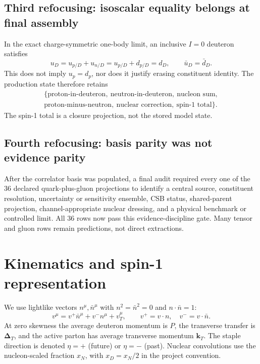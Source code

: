 \documentclass[11pt]{article}
\newcommand{\kT}{\bm{k}_{T}}
\newcommand{\DT}{\bm{\Delta}_{T}}
\begin{document}
\subsection{Third refocusing: isoscalar equality belongs at final assembly}

In the exact charge-symmetric one-body limit, an inclusive \(I=0\)
deuteron satisfies
\begin{equation}
u_D=u_{p/D}+u_{n/D}=u_{p/D}+d_{p/D}=d_D,
\qquad
\bar u_D=\bar d_D.
\label{eq:isoscalar}
\end{equation}
This does not imply \(u_p=d_p\), nor does it justify erasing constituent
identity.  The production state therefore retains
\begin{multline*}
\{\text{proton-in-deuteron},\ \text{neutron-in-deuteron},\
\text{nucleon sum},\\
\text{proton-minus-neutron},\ \text{nuclear correction},\
\text{spin-1 total}\}.
\end{multline*}
The spin-1 total is a closure projection, not the stored model state.

\subsection{Fourth refocusing: basis parity was not evidence parity}

After the correlator basis was populated, a final audit required every one
of the 36 declared quark-plus-gluon projections to identify a central
source, constituent resolution, uncertainty or sensitivity ensemble, CSB
status, shared-parent projection, channel-appropriate nuclear dressing, and
a physical benchmark or controlled limit.  All 36 rows now pass this
evidence-discipline gate.  Many tensor and gluon rows remain predictions,
not direct extractions.

\section{Kinematics and spin-1 representation}
\label{sec:representation}

We use lightlike vectors \(n^\mu,\bar n^\mu\) with
\(n^2=\bar n^2=0\) and \(n\cdot\bar n=1\):
\begin{equation}
v^\mu=v^+\bar n^\mu+v^-n^\mu+v_T^\mu,\qquad
v^+=v\cdot n,\quad v^-=v\cdot\bar n.
\end{equation}
At zero skewness the average deuteron momentum is \(P\), the transverse
transfer is \(\DT\), and the active parton has average transverse momentum
\(\kT\).  The staple direction is denoted \(\eta=+\) (future) or
\(\eta=-\) (past).  Nuclear convolutions use the nucleon-scaled fraction
\(x_N\), with \(x_D=x_N/2\) in the project convention.
\end{document}
